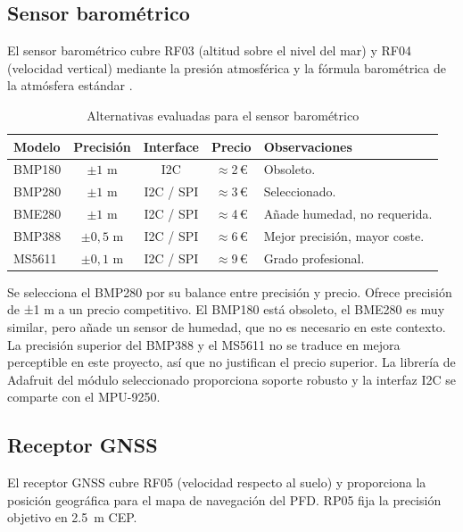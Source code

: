 \subsection{Sensor barométrico}
\label{sec:sel_baro}

El sensor barométrico cubre RF03 (altitud sobre el nivel del mar) y RF04
(velocidad vertical) mediante la presión atmosférica y la fórmula
barométrica de la atmósfera estándar \cite{icao_isa}.

\begin{table}[H]
    \centering
    \caption{Alternativas evaluadas para el sensor barométrico}
    \label{tab:sel_baro}
    \footnotesize
    \begin{tabularx}{\linewidth}{l c c c X}
        \toprule
        \textbf{Modelo} & \textbf{Precisión} & \textbf{Interface} & \textbf{Precio} & \textbf{Observaciones} \\
        \midrule
        BMP180  & $\pm 1$ m   & I2C       & $\approx$2\,\euro{}  & Obsoleto. \\
        BMP280  & $\pm 1$ m   & I2C / SPI & $\approx$3\,\euro{}  & Seleccionado. \\
        BME280  & $\pm 1$ m   & I2C / SPI & $\approx$4\,\euro{}  & Añade humedad, no requerida. \\
        BMP388  & $\pm 0{,}5$ m & I2C / SPI & $\approx$6\,\euro{}  & Mejor precisión, mayor coste. \\
        MS5611  & $\pm 0{,}1$ m & I2C / SPI & $\approx$9\,\euro{}  & Grado profesional. \\
        \bottomrule
    \end{tabularx}
\end{table}

Se selecciona el BMP280 \cite{ds_bmp280} por su balance entre precisión y precio. Ofrece precisión de ±1 m a un precio competitivo. El BMP180 está obsoleto, el BME280 es muy similar, pero añade un
sensor de humedad, que no es necesario en este contexto. La precisión superior del BMP388 y el
MS5611 no se traduce en mejora perceptible en este proyecto, así que no justifican el precio superior. La librería
de Adafruit \cite{lib_bmp280} del módulo seleccionado proporciona soporte robusto y la interfaz I2C se comparte con el MPU-9250.


\subsection{Receptor GNSS}
\label{sec:sel_gnss}

El receptor GNSS cubre RF05 (velocidad respecto al suelo) y proporciona la
posición geográfica para el mapa de navegación del PFD. RP05 fija la
precisión objetivo en \SI{2.5}{\meter} CEP.

